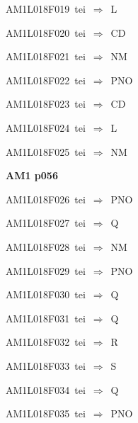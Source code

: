 {\sixrm AM1L018F019\ {\sixit tei}\ }$\Rightarrow$\ L\par\smallskip
{\sixrm AM1L018F020\ {\sixit tei}\ }$\Rightarrow$\ CD\par\smallskip
{\sixrm AM1L018F021\ {\sixit tei}\ }$\Rightarrow$\ NM\par\smallskip
{\sixrm AM1L018F022\ {\sixit tei}\ }$\Rightarrow$\ PNO\par\smallskip
{\sixrm AM1L018F023\ {\sixit tei}\ }$\Rightarrow$\ CD\par\smallskip
{\sixrm AM1L018F024\ {\sixit tei}\ }$\Rightarrow$\ L\par\smallskip
{\sixrm AM1L018F025\ {\sixit tei}\ }$\Rightarrow$\ NM\par\smallskip

\par\vfill\eject
{\bf\hfill AM1 p056\hfill\hbox{}}\par\bigskip
{\sixrm AM1L018F026\ {\sixit tei}\ }$\Rightarrow$\ PNO\par\smallskip
{\sixrm AM1L018F027\ {\sixit tei}\ }$\Rightarrow$\ Q\par\smallskip
{\sixrm AM1L018F028\ {\sixit tei}\ }$\Rightarrow$\ NM\par\smallskip
{\sixrm AM1L018F029\ {\sixit tei}\ }$\Rightarrow$\ PNO\par\smallskip
{\sixrm AM1L018F030\ {\sixit tei}\ }$\Rightarrow$\ Q\par\smallskip
{\sixrm AM1L018F031\ {\sixit tei}\ }$\Rightarrow$\ Q\par\smallskip
{\sixrm AM1L018F032\ {\sixit tei}\ }$\Rightarrow$\ R\par\smallskip
{\sixrm AM1L018F033\ {\sixit tei}\ }$\Rightarrow$\ S\par\smallskip
{\sixrm AM1L018F034\ {\sixit tei}\ }$\Rightarrow$\ Q\par\smallskip
{\sixrm AM1L018F035\ {\sixit tei}\ }$\Rightarrow$\ PNO\par\smallskip

